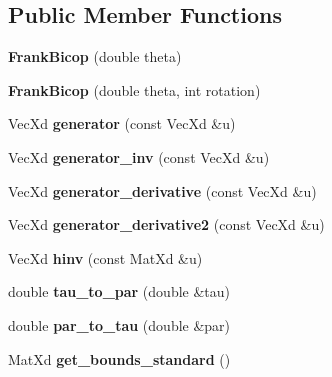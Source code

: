 \subsection*{Public Member Functions}
\begin{DoxyCompactItemize}
\item 
\hypertarget{class_frank_bicop_a6dfe1dc62e4b32890d0f928205fdc6db}{{\bfseries Frank\+Bicop} (double theta)}\label{class_frank_bicop_a6dfe1dc62e4b32890d0f928205fdc6db}

\item 
\hypertarget{class_frank_bicop_ad1b0d2279061999fe2dbac7e7879f1f3}{{\bfseries Frank\+Bicop} (double theta, int rotation)}\label{class_frank_bicop_ad1b0d2279061999fe2dbac7e7879f1f3}

\item 
\hypertarget{class_frank_bicop_aac20b71ec67ea5067c5342c085a0e306}{Vec\+Xd {\bfseries generator} (const Vec\+Xd \&u)}\label{class_frank_bicop_aac20b71ec67ea5067c5342c085a0e306}

\item 
\hypertarget{class_frank_bicop_a3e433ca2c858e95c11896d2d6a445648}{Vec\+Xd {\bfseries generator\+\_\+inv} (const Vec\+Xd \&u)}\label{class_frank_bicop_a3e433ca2c858e95c11896d2d6a445648}

\item 
\hypertarget{class_frank_bicop_a19d2a80d449caa48d75690be81c2db02}{Vec\+Xd {\bfseries generator\+\_\+derivative} (const Vec\+Xd \&u)}\label{class_frank_bicop_a19d2a80d449caa48d75690be81c2db02}

\item 
\hypertarget{class_frank_bicop_a07d9488138a598fa9aa770da2153f269}{Vec\+Xd {\bfseries generator\+\_\+derivative2} (const Vec\+Xd \&u)}\label{class_frank_bicop_a07d9488138a598fa9aa770da2153f269}

\item 
\hypertarget{class_frank_bicop_ab755de64fbdf692303b4d6436bb41583}{Vec\+Xd {\bfseries hinv} (const Mat\+Xd \&u)}\label{class_frank_bicop_ab755de64fbdf692303b4d6436bb41583}

\item 
\hypertarget{class_frank_bicop_a0a78ebba6b7ae0de8689ef7484eb9859}{double {\bfseries tau\+\_\+to\+\_\+par} (double \&tau)}\label{class_frank_bicop_a0a78ebba6b7ae0de8689ef7484eb9859}

\item 
\hypertarget{class_frank_bicop_ac59eaa94167ddfd29748215f0bee7f6c}{double {\bfseries par\+\_\+to\+\_\+tau} (double \&par)}\label{class_frank_bicop_ac59eaa94167ddfd29748215f0bee7f6c}

\item 
\hypertarget{class_frank_bicop_a7b01020a45dc1cf351cea3a1684a4143}{Mat\+Xd {\bfseries get\+\_\+bounds\+\_\+standard} ()}\label{class_frank_bicop_a7b01020a45dc1cf351cea3a1684a4143}

\end{DoxyCompactItemize}
